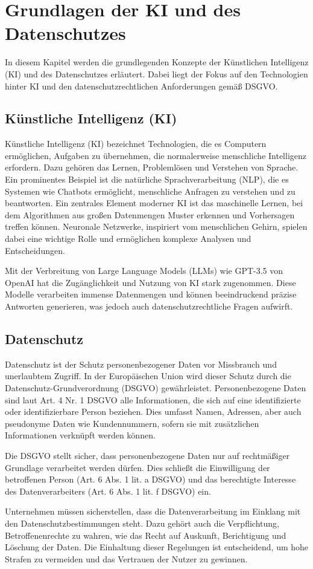 \chapter{Grundlagen der KI und des Datenschutzes}
In diesem Kapitel werden die grundlegenden Konzepte der Künstlichen Intelligenz
(KI) und des Datenschutzes erläutert. Dabei liegt der Fokus auf den Technologien
hinter KI und den datenschutzrechtlichen Anforderungen gemäß DSGVO.

\section{Künstliche Intelligenz (KI)}
Künstliche Intelligenz (KI) bezeichnet Technologien, die es Computern
ermöglichen, Aufgaben zu übernehmen, die normalerweise menschliche Intelligenz
erfordern. Dazu gehören das Lernen, Problemlösen und Verstehen von Sprache. Ein
prominentes Beispiel ist die natürliche Sprachverarbeitung (NLP), die es
Systemen wie Chatbots ermöglicht, menschliche Anfragen zu verstehen und zu
beantworten. Ein zentrales Element moderner KI ist das maschinelle Lernen, bei
dem Algorithmen aus großen Datenmengen Muster erkennen und Vorhersagen treffen
können. Neuronale Netzwerke, inspiriert vom menschlichen Gehirn, spielen dabei
eine wichtige Rolle und ermöglichen komplexe Analysen und Entscheidungen.

Mit der Verbreitung von Large Language Models (LLMs) wie GPT-3.5 von OpenAI hat
die Zugänglichkeit und Nutzung von KI stark zugenommen. Diese Modelle
verarbeiten immense Datenmengen und können beeindruckend präzise Antworten
generieren, was jedoch auch datenschutzrechtliche Fragen aufwirft.

\section{Datenschutz}
Datenschutz ist der Schutz personenbezogener Daten vor Missbrauch und
unerlaubtem Zugriff. In der Europäischen Union wird dieser Schutz durch die
Datenschutz-Grundverordnung (DSGVO) gewährleistet. Personenbezogene Daten sind
laut Art. 4 Nr. 1 DSGVO alle Informationen, die sich auf eine identifizierte
oder identifizierbare Person beziehen. Dies umfasst Namen, Adressen, aber auch
pseudonyme Daten wie Kundennummern, sofern sie mit zusätzlichen Informationen
verknüpft werden können.

Die DSGVO stellt sicher, dass personenbezogene Daten nur auf rechtmäßiger
Grundlage verarbeitet werden dürfen. Dies schließt die Einwilligung der
betroffenen Person (Art. 6 Abs. 1 lit. a DSGVO) und das berechtigte Interesse
des Datenverarbeiters (Art. 6 Abs. 1 lit. f DSGVO) ein. 

Unternehmen müssen sicherstellen, dass die Datenverarbeitung im Einklang mit den
Datenschutzbestimmungen steht. Dazu gehört auch die Verpflichtung,
Betroffenenrechte zu wahren, wie das Recht auf Auskunft, Berichtigung und
Löschung der Daten. Die Einhaltung dieser Regelungen ist entscheidend, um hohe
Strafen zu vermeiden und das Vertrauen der Nutzer zu gewinnen.